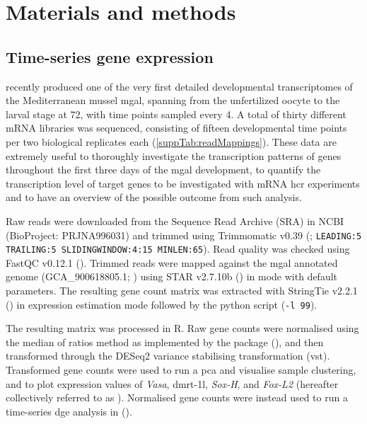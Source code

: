 \section{Materials and methods} \label{chapter:insitu-MM}
\subsection{Time-series gene expression}
 recently produced one of the very first detailed developmental transcriptomes of the Mediterranean mussel \gls{mgal}, spanning from the unfertilized oocyte to the larval stage at \qty{72}{\hpf}, with time points sampled every \qty{4}{\hpf}. A total of thirty different mRNA libraries was sequenced, consisting of fifteen developmental time points per two biological replicates each (\cref{suppTab:readMappings}). These data are extremely useful to thoroughly investigate the transcription patterns of genes throughout the first three days of the \gls{mgal} development, to quantify the transcription level of target genes to be investigated with mRNA \gls{hcr} experiments and to have an overview of the possible outcome from such analysis.

Raw reads were downloaded from the Sequence Read Archive (SRA) in NCBI (BioProject: PRJNA996031) and trimmed using Trimmomatic v0.39 (; \verb|LEADING:5| \verb|TRAILING:5 SLIDINGWINDOW:4:15 MINLEN:65|). Read quality was checked using FastQC v0.12.1 (). Trimmed reads were mapped against the \gls{mgal} annotated genome (GCA\_900618805.1; ) using STAR v2.7.10b () in  mode with default parameters. The resulting gene count matrix was extracted with StringTie v2.2.1 () in expression estimation mode followed by the python script  (\verb|-l 99|).

The resulting matrix was processed in R. Raw gene counts were normalised using the median of ratios method as implemented by the  package (), and then transformed through the DESeq2 variance stabilising transformation (vst). Transformed gene counts were used to run a \gls{pca} and visualise sample clustering, and to plot expression values of \textit{Vasa}, \gls{dmrt-1l}, \textit{Sox-H}, and \textit{Fox-L2} (hereafter collectively referred to as ). Normalised gene counts were instead used to run a time-series \gls{dge} analysis in  ().

